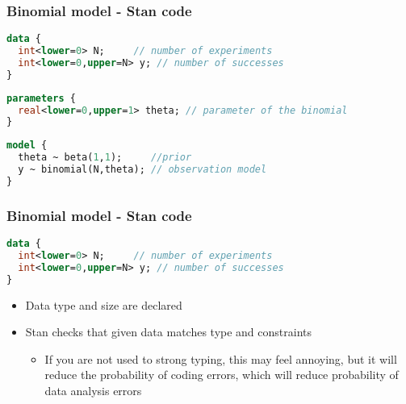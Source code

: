 \documentclass[finnish,english,t]{beamer}
\begin{document}
\begin{frame}[fragile]
  \frametitle{Binomial model - Stan code}
  
  {\small\color{gray}
{
  \begin{lstlisting}[language=Stan]
data {
  int<lower=0> N;     // number of experiments
  int<lower=0,upper=N> y; // number of successes
}
\end{lstlisting}}
  {
\begin{lstlisting}[language=Stan]
parameters {
  real<lower=0,upper=1> theta; // parameter of the binomial
}
\end{lstlisting}}
{
\begin{lstlisting}[language=Stan]
model {
  theta ~ beta(1,1);     //prior
  y ~ binomial(N,theta); // observation model
}
\end{lstlisting}
}}
\end{frame} 

\begin{frame}[fragile]
  \frametitle{Binomial model - Stan code}
  
  {\small
  \begin{lstlisting}[language=Stan]
data {
  int<lower=0> N;     // number of experiments
  int<lower=0,upper=N> y; // number of successes
}
\end{lstlisting}}

  \begin{itemize}
  \item Data type and size are declared
  \item Stan checks that given data matches type and constraints
    \begin{itemize}
    \item<2-> If you are not used to strong typing, this may
      feel annoying, but it will reduce the probability of coding
      errors, which will reduce probability of data analysis errors
    \end{itemize}
  \end{itemize}
\end{frame}
\end{document}
